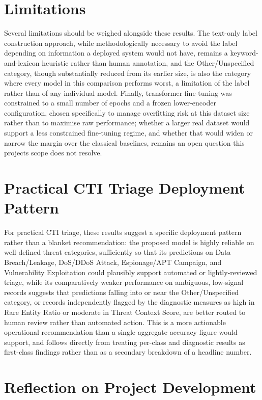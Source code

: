 \documentclass[12pt,a4paper]{report}
\begin{document}
\section{Limitations}

Several limitations should be weighed alongside these results. The
text-only label construction approach, while methodologically necessary
to avoid the label depending on information a deployed system would not
have, remains a keyword-and-lexicon heuristic rather than human
annotation, and the Other/Unspecified category, though substantially
reduced from its earlier size, is also the category where every model in
this comparison performs worst, a limitation of the label rather than of
any individual model. Finally, transformer fine-tuning was constrained
to a small number of epochs and a frozen lower-encoder configuration,
chosen specifically to manage overfitting risk at this dataset size
rather than to maximise raw performance; whether a larger real dataset
would support a less constrained fine-tuning regime, and whether that
would widen or narrow the margin over the classical baselines, remains
an open question this project\textquotesingle s scope does not resolve.
\section{Practical CTI
Triage Deployment Pattern}

For practical CTI triage, these results suggest a specific deployment
pattern rather than a blanket recommendation: the proposed model is
highly reliable on well-defined threat categories, sufficiently so that
its predictions on Data Breach/Leakage, DoS/DDoS Attack, Espionage/APT
Campaign, and Vulnerability Exploitation could plausibly support
automated or lightly-reviewed triage, while its comparatively weaker
performance on ambiguous, low-signal records suggests that predictions
falling into or near the Other/Unspecified category, or records
independently flagged by the diagnostic measures as high in Rare Entity
Ratio or moderate in Threat Context Score, are better routed to human
review rather than automated action. This is a more actionable
operational recommendation than a single aggregate accuracy figure would
support, and follows directly from treating per-class and diagnostic
results as first-class findings rather than as a secondary breakdown of
a headline number.
\section{Reflection on
Project Development}
\end{document}
